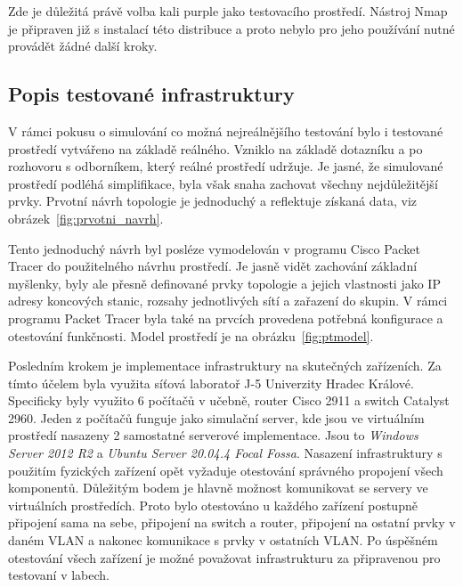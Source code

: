Zde je důležitá právě volba kali purple jako testovacího prostředí.
Nástroj Nmap je připraven již s instalací této distribuce a proto nebylo pro jeho používání nutné provádět žádné další kroky.


\subsection{Popis testované infrastruktury}\label{subsec:popis-testovane-infrastruktury}
V rámci pokusu o simulování co možná nejreálnějšího testování bylo i testované prostředí vytvářeno na základě reálného.
Vzniklo na základě dotazníku a po rozhovoru s odborníkem, který reálné prostředí udržuje.
Je jasné, že simulované prostředí podléhá simplifikace, byla však snaha zachovat všechny nejdůležitější prvky.
Prvotní návrh topologie je jednoduchý a reflektuje získaná data, viz obrázek~\ref{fig:prvotni_navrh}.


Tento jednoduchý návrh byl posléze vymodelován v programu Cisco Packet Tracer do použitelného návrhu prostředí.
Je jasně vidět zachování základní myšlenky, byly ale přesně definované prvky topologie a jejich vlastnosti jako IP adresy koncových stanic, rozsahy jednotlivých sítí a zařazení do  skupin.
V rámci programu Packet Tracer byla také na prvcích provedena potřebná konfigurace a otestování funkčnosti.
Model prostředí je na obrázku~\ref{fig:ptmodel}.



Posledním krokem je implementace infrastruktury na skutečných zařízeních.
Za tímto účelem byla využita síťová laboratoř J-5 Univerzity Hradec Králové.
Specificky byly využito 6 počítačů v učebně, router Cisco 2911 a switch Catalyst 2960.
Jeden z počítačů funguje jako simulační server, kde jsou ve virtuálním prostředí nasazeny 2 samostatné serverové implementace.
Jsou to \textit{Windows Server 2012 R2} a \textit{Ubuntu Server 20.04.4 Focal Fossa}.
Nasazení infrastruktury s použitím fyzických zařízení opět vyžaduje otestování správného propojení všech komponentů.
Důležitým bodem je hlavně možnost komunikovat se servery ve virtuálních prostředích.
Proto bylo otestováno u každého zařízení postupně připojení sama na sebe, připojení na switch a router, připojení na ostatní prvky v daném \ac{VLAN} a nakonec komunikace s prvky v ostatních \ac{VLAN}.
Po úspěšném otestování všech zařízení je možné považovat  infrastrukturu za připravenou pro testovaní v labech.

